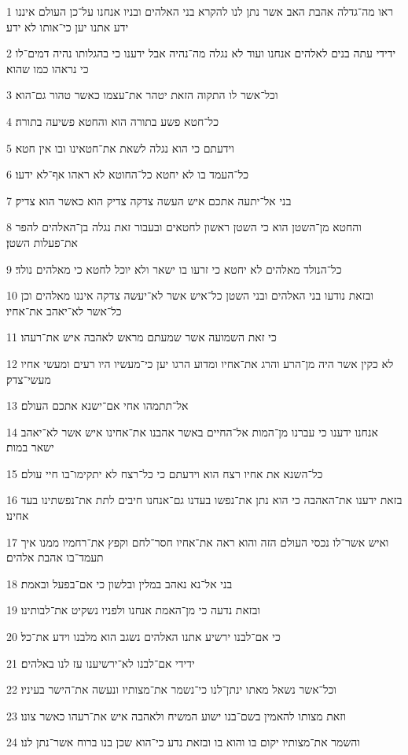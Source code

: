 \par 1 ראו מה־גדלה אהבת האב אשר נתן לנו להקרא בני האלהים ובניו אנחנו על־כן העולם איננו ידע אתנו יען כי־אותו לא ידע׃
\par 2 ידידי עתה בנים לאלהים אנחנו ועוד לא נגלה מה־נהיה אבל ידענו כי בהגלותו נהיה דמים־לו כי נראהו כמו שהוא׃
\par 3 וכל־אשר לו התקוה הזאת יטהר את־עצמו כאשר טהור גם־הוא׃
\par 4 כל־חטא פשע בתורה הוא והחטא פשיעה בתורה׃
\par 5 וידעתם כי הוא נגלה לשאת את־חטאינו ובו אין חטא׃
\par 6 כל־העמד בו לא יחטא כל־החוטא לא ראהו אף־לא ידעו׃
\par 7 בני אל־יתעה אתכם איש העשה צדקה צדיק הוא כאשר הוא צדיק׃
\par 8 והחטא מן־השטן הוא כי השטן ראשון לחטאים ובעבור זאת נגלה בן־האלהים להפר את־פעלות השטן׃
\par 9 כל־הנולד מאלהים לא יחטא כי זרעו בו ישאר ולא יוכל לחטא כי מאלהים נולד׃
\par 10 ובזאת נודעו בני האלהים ובני השטן כל־איש אשר לא־יעשה צדקה איננו מאלהים וכן כל־אשר לא־יאהב את־אחיו׃
\par 11 כי זאת השמועה אשר שמעתם מראש לאהבה איש את־רעהו׃
\par 12 לא כקין אשר היה מן־הרע והרג את־אחיו ומדוע הרגו יען כי־מעשיו היו רעים ומעשי אחיו מעשי־צדק׃
\par 13 אל־תתמהו אחי אם־ישנא אתכם העולם׃
\par 14 אנחנו ידענו כי עברנו מן־המות אל־החיים באשר אהבנו את־אחינו איש אשר לא־יאהב ישאר במות׃
\par 15 כל־השנא את אחיו רצח הוא וידעתם כי כל־רצח לא יתקימו־בו חיי עולם׃
\par 16 בזאת ידענו את־האהבה כי הוא נתן את־נפשו בעדנו גם־אנחנו חיבים לתת את־נפשתינו בעד אחינו׃
\par 17 ואיש אשר־לו נכסי העולם הזה והוא ראה את־אחיו חסר־לחם וקפץ את־רחמיו ממנו איך תעמד־בו אהבת אלהים׃
\par 18 בני אל־נא נאהב במלין ובלשון כי אם־בפעל ובאמת׃
\par 19 ובזאת נדעה כי מן־האמת אנחנו ולפניו נשקיט את־לבותינו׃
\par 20 כי אם־לבנו ירשיע אתנו האלהים נשגב הוא מלבנו וידע את־כל׃
\par 21 ידידי אם־לבנו לא־ירשיענו עז לנו באלהים׃
\par 22 וכל־אשר נשאל מאתו ינתן־לנו כי־נשמר את־מצותיו ונעשה את־הישר בעיניו׃
\par 23 וזאת מצותו להאמין בשם־בנו ישוע המשיח ולאהבה איש את־רעהו כאשר צונו׃
\par 24 והשמר את־מצותיו יקום בו והוא בו ובזאת נדע כי־הוא שכן בנו ברוח אשר־נתן לנו׃

